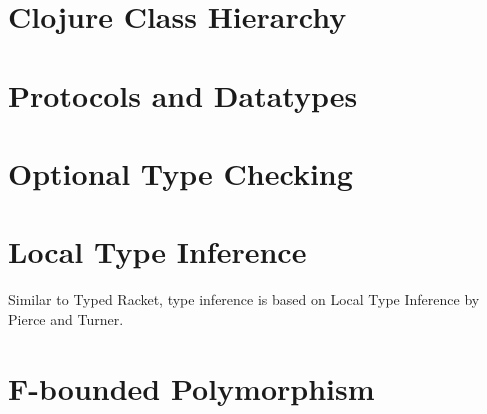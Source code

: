 
%
%
%
%
%

\section{Clojure Class Hierarchy}
\section{Protocols and Datatypes}
\section{Optional Type Checking}
\section{Local Type Inference}

Similar to Typed Racket, type inference is based on Local Type Inference
by Pierce and Turner.

\section{F-bounded Polymorphism}

